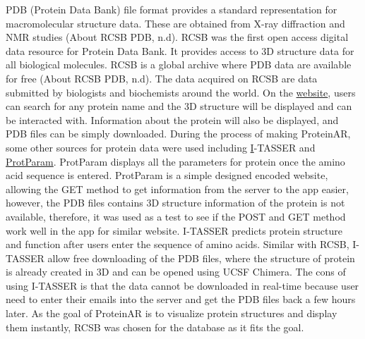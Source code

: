 PDB (Protein Data Bank) file format provides a standard representation for macromolecular structure data. These are obtained from X-ray diffraction and NMR studies (About RCSB PDB, n.d).
RCSB was the first open access digital data resource for Protein Data Bank. It provides access to 3D structure data for all biological molecules. RCSB is a global archive where PDB data are available for free (About RCSB PDB, n.d). The data acquired on RCSB are data submitted by biologists and biochemists around the world. On the \href{https://www.rcsb.org/}{website}, users can search for any protein name and the 3D structure will be displayed and can be interacted with. Information about the protein will also be displayed, and PDB files can be simply downloaded.
During the process of making ProteinAR, some other sources for protein data were used including \href{ https://zhanglab.ccmb.med.umich.edu/I-TASSER/}I-TASSER and \href{https://web.expasy.org/protparam/} {ProtParam}. 
ProtParam displays all the parameters for protein once the amino acid sequence is entered. ProtParam is a simple designed encoded website, allowing the GET method to get information from the server to the app easier, however, the PDB files contains 3D structure information of the protein is not available, therefore, it was used as a test to see if the POST and GET method work well in the app for similar website. 
I-TASSER predicts protein structure and function after users enter the sequence of amino acids. Similar with RCSB, I-TASSER allow free downloading of the PDB files, where the structure of protein is already created in 3D and can be opened using UCSF Chimera. The cons of using I-TASSER is that the data cannot be downloaded in real-time because user need to enter their emails into the server and get the PDB files back a few hours later. 
As the goal of ProteinAR is to visualize protein structures and display them instantly, RCSB was chosen for the database as it fits the goal.  

